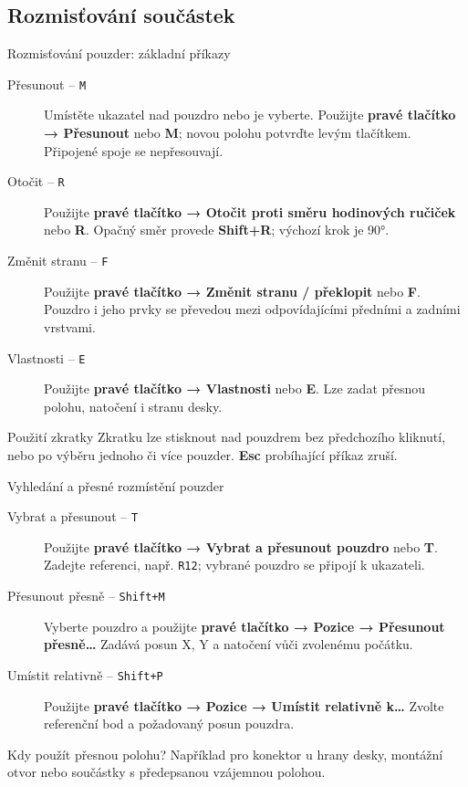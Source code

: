 \documentclass{beamer}
\begin{document}
\subsection{\texorpdfstring{Rozmisťování součástek}{Rozmistovani soucastek}}
\begin{frame}{Rozmisťování pouzder: základní příkazy}
	\small
	\begin{description}
		\item[Přesunout -- \texttt{M}] Umístěte ukazatel nad pouzdro nebo je vyberte. Použijte \textbf{pravé tlačítko → Přesunout} nebo \textbf{M}; novou polohu potvrďte levým tlačítkem. Připojené spoje se nepřesouvají.
		\item[Otočit -- \texttt{R}] Použijte \textbf{pravé tlačítko → Otočit proti směru hodinových ručiček} nebo \textbf{R}. Opačný směr provede \textbf{Shift+R}; výchozí krok je 90°.
		\item[Změnit stranu -- \texttt{F}] Použijte \textbf{pravé tlačítko → Změnit stranu / překlopit} nebo \textbf{F}. Pouzdro i jeho prvky se převedou mezi odpovídajícími předními a zadními vrstvami.
		\item[Vlastnosti -- \texttt{E}] Použijte \textbf{pravé tlačítko → Vlastnosti} nebo \textbf{E}. Lze zadat přesnou polohu, natočení i stranu desky.
	\end{description}
	\begin{block}{Použití zkratky}
	Zkratku lze stisknout nad pouzdrem bez předchozího kliknutí, nebo po výběru jednoho či více pouzder. \textbf{Esc} probíhající příkaz zruší.
	\end{block}
\end{frame}

\begin{frame}{Vyhledání a přesné rozmístění pouzder}
	\begin{description}
		\item[Vybrat a přesunout -- \texttt{T}] Použijte \textbf{pravé tlačítko → Vybrat a přesunout pouzdro} nebo \textbf{T}. Zadejte referenci, např. \texttt{R12}; vybrané pouzdro se připojí k ukazateli.
		\item[Přesunout přesně -- \texttt{Shift+M}] Vyberte pouzdro a použijte \textbf{pravé tlačítko → Pozice → Přesunout přesně\ldots} Zadává posun X, Y a natočení vůči zvolenému počátku.
		\item[Umístit relativně -- \texttt{Shift+P}] Použijte \textbf{pravé tlačítko → Pozice → Umístit relativně k\ldots} Zvolte referenční bod a požadovaný posun pouzdra.
	\end{description}
	\begin{block}{Kdy použít přesnou polohu?}
	Například pro konektor u hrany desky, montážní otvor nebo součástky s předepsanou vzájemnou polohou.
	\end{block}
\end{frame}
\end{document}
